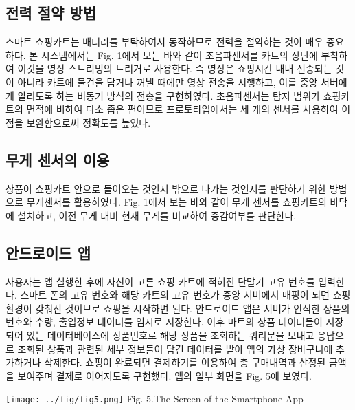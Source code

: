 \documentclass[smallextended]{svjour3}       %
\begin{document}
\hypertarget{uxc804uxb825-uxc808uxc57d-uxbc29uxbc95}{%
\subsection{전력 절약
방법}\label{uxc804uxb825-uxc808uxc57d-uxbc29uxbc95}}

스마트 쇼핑카트는 배터리를 부탁하여서 동작하므로 전력을 절약하는 것이
매우 중요하다. 본 시스템에서는 Fig. 1에서 보는 바와 같이 초음파센서를
카트의 상단에 부착하여 이것을 영상 스트리밍의 트리거로 사용한다. 즉
영상은 쇼핑시간 내내 전송되는 것이 아니라 카트에 물건을 담거나 꺼낼
때에만 영상 전송을 시행하고, 이를 중앙 서버에게 알리도록 하는 비동기
방식의 전송을 구현하였다. 초음파센서는 탐지 범위가 쇼핑카트의 면적에
비하여 다소 좁은 편이므로 프로토타입에서는 세 개의 센서를 사용하여 이
점을 보완함으로써 정확도를 높였다.

\hypertarget{uxbb34uxac8c-uxc13cuxc11cuxc758-uxc774uxc6a9}{%
\subsection{무게 센서의
이용}\label{uxbb34uxac8c-uxc13cuxc11cuxc758-uxc774uxc6a9}}

상품이 쇼핑카트 안으로 들어오는 것인지 밖으로 나가는 것인지를 판단하기
위한 방법으로 무게센서를 활용하였다. Fig. 1에서 보는 바와 같이 무게
센서를 쇼핑카트의 바닥에 설치하고, 이전 무게 대비 현재 무게를 비교하여
증감여부를 판단한다.

\hypertarget{uxc548uxb4dcuxb85cuxc774uxb4dc-uxc571}{%
\subsection{안드로이드 앱}\label{uxc548uxb4dcuxb85cuxc774uxb4dc-uxc571}}

사용자는 앱 실행한 후에 자신이 고른 쇼핑 카트에 적혀진 단말기 고유
번호를 입력한다. 스마트 폰의 고유 번호와 해당 카트의 고유 번호가 중앙
서버에서 매핑이 되면 쇼핑 환경이 갖춰진 것이므로 쇼핑을 시작하면 된다.
안드로이드 앱은 서버가 인식한 상품의 번호와 수량, 출입정보 데이터를
임시로 저장한다. 이후 마트의 상품 데이터들이 저장되어 있는
데이터베이스에 상품번호로 해당 상품을 조회하는 쿼리문을 보내고 응답으로
조회된 상품과 관련된 세부 정보들이 담긴 데이터를 받아 앱의 가상
장바구니에 추가하거나 삭제한다. 쇼핑이 완료되면 결제하기를 이용하여 총
구매내역과 산정된 금액을 보여주며 결제로 이어지도록 구현했다. 앱의 일부
화면을 Fig. 5에 보였다.

\texttt{[image: ../fig/fig5.png]} Fig. 5.The Screen of the Smartphone
App
\end{document}
